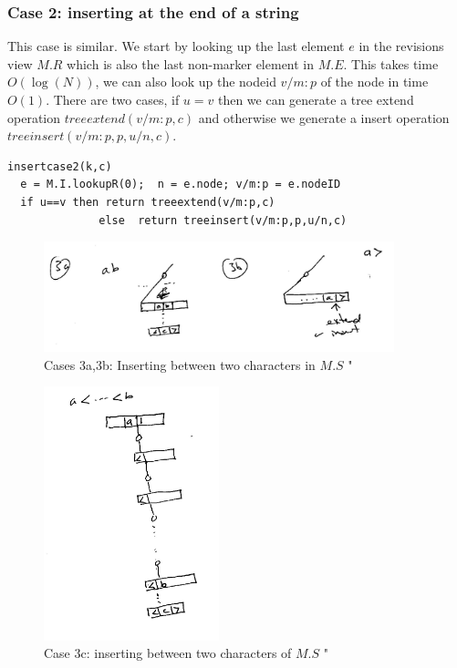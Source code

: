 \documentclass{amsart}
\begin{document}
\subsubsection{Case 2: inserting at the end of a string}
This case is similar. We start by looking up the last element $e$ in the revisions view $M.R$ which is also the last non-marker element in $M.E$. This takes time $O(\log(N))$, we can also look up the nodeid $v/m:p$ of the node in time $O(1)$.  There are
two cases, if $u=v$ then we can generate a tree extend operation
$treeextend(v/m:p,c)$ and otherwise we generate a insert operation
$treeinsert(v/m:p,p,u/n,c)$.
\begin{verbatim}
insertcase2(k,c)
  e = M.I.lookupR(0);  n = e.node; v/m:p = e.nodeID
  if u==v then return treeextend(v/m:p,c)
              else  return treeinsert(v/m:p,p,u/n,c)
\end{verbatim}

\begin{figure}[h]
\centering
\includegraphics[width=4.0in]{insertMiddle001.jpg}
\caption{Cases 3a,3b: Inserting between two characters in $M.S$ \label{fig:midinsert}"}
\end{figure}

\begin{figure}[h]
\centering
\includegraphics[width=2.0in]{insertMiddle002.jpg}
\caption{Case 3c: inserting between two characters of $M.S$ \label{fig:frontinsert}"}
\end{figure}
\end{document}
